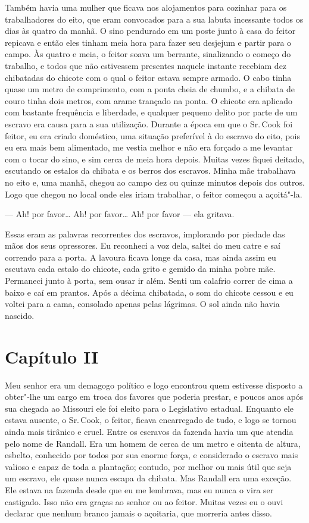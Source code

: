 Também havia uma mulher que ficava nos alojamentos para cozinhar para os
trabalhadores do eito, que eram convocados para a sua labuta incessante
todos os dias às quatro da manhã. O sino pendurado em um poste junto à
casa do feitor repicava e então eles tinham meia hora para fazer seu
desjejum e partir para o campo. Às quatro e meia, o feitor soava um
berrante, sinalizando o começo do trabalho, e todos que não estivessem
presentes naquele instante recebiam dez chibatadas do chicote com o qual
o feitor estava sempre armado. O cabo tinha quase um metro de
comprimento, com a ponta cheia de chumbo, e a chibata de couro tinha
dois metros, com arame trançado na ponta. O chicote era aplicado com
bastante frequência e liberdade, e qualquer pequeno delito por parte de
um escravo era causa para a sua utilização. Durante a época em que o Sr.\,Cook foi feitor, eu era criado doméstico, uma situação preferível à do
escravo do eito, pois eu era mais bem alimentado, me vestia melhor e não
era forçado a me levantar com o tocar do sino, e sim cerca de meia hora
depois. Muitas vezes fiquei deitado, escutando os estalos da chibata e
os berros dos escravos. Minha mãe trabalhava no eito e, uma manhã,
chegou ao campo dez ou quinze minutos depois dos outros. Logo que chegou
no local onde eles iriam trabalhar, o feitor começou a açoitá"-la.

--- Ah! por favor\ldots{} Ah! por favor\ldots{} Ah! por favor --- ela
gritava.

Essas eram as palavras recorrentes dos escravos, implorando por piedade
das mãos dos seus opressores. Eu reconheci a voz dela, saltei do meu
catre e saí correndo para a porta. A lavoura ficava longe da casa, mas
ainda assim eu escutava cada estalo do chicote, cada grito e gemido da
minha pobre mãe. Permaneci junto à porta, sem ousar ir além. Senti um
calafrio correr de cima a baixo e caí em prantos. Após a décima
chibatada, o som do chicote cessou e eu voltei para a cama, consolado
apenas pelas lágrimas. O sol ainda não havia nascido.

\chapter*{Capítulo II}

Meu senhor era um demagogo político e logo encontrou quem estivesse
disposto a obter"-lhe um cargo em troca dos favores que poderia prestar,
e poucos anos após sua chegada ao Missouri ele foi eleito para o
Legislativo estadual. Enquanto ele estava ausente, o Sr.\,Cook, o feitor,
ficava encarregado de tudo, e logo se tornou ainda mais tirânico e
cruel. Entre os escravos da fazenda havia um que atendia pelo nome de
Randall. Era um homem de cerca de um metro e oitenta de altura, esbelto,
conhecido por todos por sua enorme força, e considerado o escravo mais
valioso e capaz de toda a plantação; contudo, por melhor ou mais útil
que seja um escravo, ele quase nunca escapa da chibata. Mas Randall era
uma exceção. Ele estava na fazenda desde que eu me lembrava, mas eu
nunca o vira ser castigado. Isso não era graças ao senhor ou ao feitor.
Muitas vezes eu o ouvi declarar que nenhum branco jamais o açoitaria,
que morreria antes disso.

